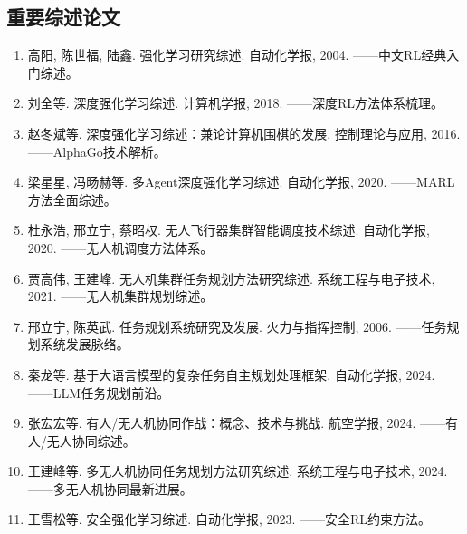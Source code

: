 \subsection*{重要综述论文}
\begin{enumerate}
  \item 高阳, 陈世福, 陆鑫. 强化学习研究综述. 自动化学报, 2004. ——中文RL经典入门综述。
  \item 刘全等. 深度强化学习综述. 计算机学报, 2018. ——深度RL方法体系梳理。
  \item 赵冬斌等. 深度强化学习综述：兼论计算机围棋的发展. 控制理论与应用, 2016. ——AlphaGo技术解析。
  \item 梁星星, 冯旸赫等. 多Agent深度强化学习综述. 自动化学报, 2020. ——MARL方法全面综述。
  \item 杜永浩, 邢立宁, 蔡昭权. 无人飞行器集群智能调度技术综述. 自动化学报, 2020. ——无人机调度方法体系。
  \item 贾高伟, 王建峰. 无人机集群任务规划方法研究综述. 系统工程与电子技术, 2021. ——无人机集群规划综述。
  \item 邢立宁, 陈英武. 任务规划系统研究及发展. 火力与指挥控制, 2006. ——任务规划系统发展脉络。
  \item 秦龙等. 基于大语言模型的复杂任务自主规划处理框架. 自动化学报, 2024. ——LLM任务规划前沿。
  \item 张宏宏等. 有人/无人机协同作战：概念、技术与挑战. 航空学报, 2024. ——有人/无人协同综述。
  \item 王建峰等. 多无人机协同任务规划方法研究综述. 系统工程与电子技术, 2024. ——多无人机协同最新进展。
  \item 王雪松等. 安全强化学习综述. 自动化学报, 2023. ——安全RL约束方法。
\end{enumerate}
